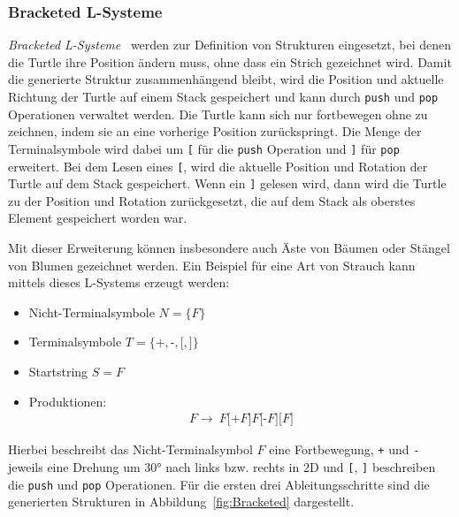\subsubsection{Bracketed L-Systeme}
\textit{Bracketed L-Systeme}~\cite*{Shaker2016} werden zur Definition von Strukturen eingesetzt, bei denen die Turtle ihre Position ändern muss, ohne dass ein Strich gezeichnet wird.
Damit die generierte Struktur zusammenhängend bleibt, wird die Position und aktuelle Richtung der Turtle auf einem Stack gespeichert und kann durch \texttt{push} und \texttt{pop} Operationen verwaltet werden.
Die Turtle kann sich nur fortbewegen ohne zu zeichnen, indem sie an eine vorherige Position zurückspringt.
Die Menge der Terminalsymbole wird dabei um \texttt{[} für die \texttt{push} Operation und \texttt{]} für \texttt{pop} erweitert.
Bei dem Lesen eines \texttt{[}, wird die aktuelle Position und Rotation der Turtle auf dem Stack gespeichert.
Wenn ein \texttt{]} gelesen wird, dann wird die Turtle zu der Position und Rotation zurückgesetzt, die auf dem Stack als oberstes Element gespeichert worden war.

Mit dieser Erweiterung können insbesondere auch Äste von Bäumen oder Stängel von Blumen gezeichnet werden.
Ein Beispiel für eine Art von Strauch kann mittels dieses L-Systems erzeugt werden:
\begin{itemize}
    \item Nicht-Terminalsymbole $N=\{F\}$
    \item Terminalsymbole $T=\{\texttt{+},\texttt{-},\texttt{[},\texttt{]}\}$
    \item Startstring $S=F$
    \item Produktionen:
          \begin{align*}
              F\rightarrow~F\texttt{[+}F\texttt{]}F\texttt{[-}F\texttt{]}\texttt{[}F\texttt{]}
          \end{align*}
\end{itemize}

Hierbei beschreibt das Nicht-Terminalsymbol $F$ eine Fortbewegung, \texttt{+} und \texttt{-} jeweils eine Drehung um \ang{30} nach links bzw. rechts in 2D und \texttt{[}, \texttt{]} beschreiben die \texttt{push} und \texttt{pop} Operationen.
Für die ersten drei Ableitungsschritte sind die generierten Strukturen in Abbildung~\ref{fig:Bracketed} dargestellt.

